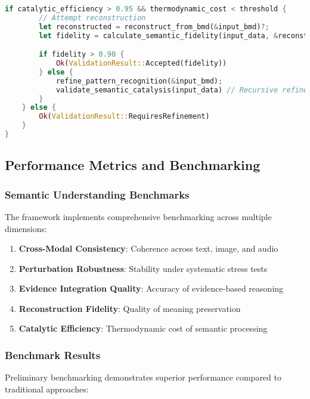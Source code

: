 \documentclass[12pt,a4paper,twoside]{article}
\begin{document}
\begin{itemize}
\begin{lstlisting}[language=rust,caption=Reconstruction Validation Algorithm]
    if catalytic_efficiency > 0.95 && thermodynamic_cost < threshold {
        // Attempt reconstruction
        let reconstructed = reconstruct_from_bmd(&input_bmd)?;
        let fidelity = calculate_semantic_fidelity(input_data, &reconstructed);

        if fidelity > 0.90 {
            Ok(ValidationResult::Accepted(fidelity))
        } else {
            refine_pattern_recognition(&input_bmd);
            validate_semantic_catalysis(input_data) // Recursive refinement
        }
    } else {
        Ok(ValidationResult::RequiresRefinement)
    }
}
\end{lstlisting}

\subsection{Performance Metrics and Benchmarking}

\subsubsection{Semantic Understanding Benchmarks}

The framework implements comprehensive benchmarking across multiple dimensions:

\begin{enumerate}
\item \textbf{Cross-Modal Consistency}: Coherence across text, image, and audio
\item \textbf{Perturbation Robustness}: Stability under systematic stress tests
\item \textbf{Evidence Integration Quality}: Accuracy of evidence-based reasoning
\item \textbf{Reconstruction Fidelity}: Quality of meaning preservation
\item \textbf{Catalytic Efficiency}: Thermodynamic cost of semantic processing
\end{enumerate}

\subsubsection{Benchmark Results}

Preliminary benchmarking demonstrates superior performance compared to traditional approaches:


\end{itemize}
\end{document}
